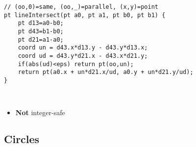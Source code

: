 \documentclass[12pt,t]{beamer}
\newcommand{\bi}{\begin{itemize}}
\newcommand{\ei}{\end{itemize}}
\begin{document}
\begin{frame}[fragile]
  \vspace{20pt}
  \begin{verbatim}
// (oo,0)=same, (oo,_)=parallel, (x,y)=point
pt lineIntersect(pt a0, pt a1, pt b0, pt b1) {
    pt d13=a0-b0;
    pt d43=b1-b0;
    pt d21=a1-a0;
    coord un = d43.x*d13.y - d43.y*d13.x;
    coord ud = d43.y*d21.x - d43.x*d21.y;
    if(abs(ud)<eps) return pt(oo,un);
    return pt(a0.x + un*d21.x/ud, a0.y + un*d21.y/ud);
}
  \end{verbatim} 
  \ \\ \pause
  \bi
 	\item \textbf{Not} integer-safe
  \ei
\end{frame}


\subsection{Circles}
\end{document}
